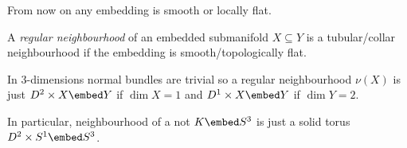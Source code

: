 \documentclass[a4paper]{article}
\begin{document}
\begin{convention}
  From now on any embedding is smooth or locally flat.
\end{convention}

\begin{definition}
  A \emph{regular neighbourhood} of an embedded submanifold \(X \subseteq Y\) is a tubular/collar neighbourhood if the embedding is smooth/topologically flat.
\end{definition}

In 3-dimensions normal bundles are trivial so a regular neighbourhood \(\nu(X)\) is just \(D^2 \times X \embed Y\) if \(\dim X = 1\) and \(D^1 \times X \embed Y\) if \(\dim Y = 2\).

In particular, neighbourhood of a not \(K \embed S^3\) is just a solid torus \(D^2 \times S^1 \embed S^3\).












\printindex
\end{document}
